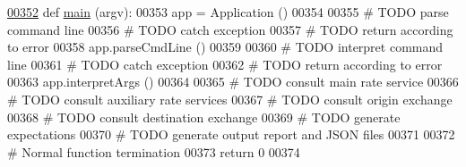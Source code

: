 \begin{DoxyCode}
\hypertarget{namespacee2e.tex_l00352}{}\hyperlink{namespacee2e_afb3e7d384688a07b72e1df5201192375}{00352} \textcolor{keyword}{def }\hyperlink{namespacee2e_afb3e7d384688a07b72e1df5201192375}{main} (argv):
00353     app = Application ()
00354     
00355     \textcolor{comment}{# TODO parse command line }
00356     \textcolor{comment}{# TODO catch exception}
00357     \textcolor{comment}{# TODO return according to error}
00358     app.parseCmdLine ()
00359     
00360     \textcolor{comment}{# TODO interpret command line }
00361     \textcolor{comment}{# TODO catch exception}
00362     \textcolor{comment}{# TODO return according to error}
00363     app.interpretArgs ()
00364     
00365     \textcolor{comment}{# TODO consult main rate service}
00366     \textcolor{comment}{# TODO consult auxiliary rate services}
00367     \textcolor{comment}{# TODO consult origin exchange }
00368     \textcolor{comment}{# TODO consult destination exchange}
00369     \textcolor{comment}{# TODO generate expectations}
00370     \textcolor{comment}{# TODO generate output report and JSON files}
00371 
00372     \textcolor{comment}{# Normal function termination}
00373     \textcolor{keywordflow}{return} 0
00374 
\end{DoxyCode}
